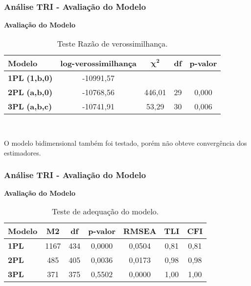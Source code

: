 \documentclass{beamer}
\begin{document}
	\begin{frame}
		
		\frametitle{Análise TRI - Avaliação do Modelo}
		
		\begin{center}
			\textbf{Avaliação do Modelo}
		\end{center}
		
		\begin{table}
			\centering
			\caption{Teste Razão de verossimilhança.}
			\begin{tabular}{lcccc}
				\hline
				\textbf{Modelo} &  \textbf{ log-verossimilhança }& $\boldsymbol{\chi^2}$ & \textbf{df} & \textbf{p-valor }\\ 
				\hline
				\textbf{1PL} \textbf{(1,b,0)} &  -10991,57 &  &  &  \\ 
				\hline
				\textbf{2PL} \textbf{(a,b,0)} & -10768,56 & 446,01 & 29 & 0,000 \\ 
				\hline
				\textbf{3PL} \textbf{(a,b,c)} & -10741,91 & 53,29 & 30 & 0,006 \\ 
				\hline
			\end{tabular}\\
		\end{table}
		
	O modelo bidimensional também foi testado, porém não obteve convergência dos estimadores.
		
	\end{frame}
	

\begin{frame}
	
	\frametitle{Análise TRI - Avaliação do Modelo}
	
	\begin{center}
		\textbf{Avaliação do Modelo}
	\end{center}
	
	
	\begin{table}
		\centering
		\caption{Teste de adequação do modelo.}
		\begin{tabular}{lcccccc}
			\hline
			\textbf{Modelo} & \textbf{M2}& \textbf{df} & \textbf{p-valor} & \textbf{RMSEA} & \textbf{TLI} & \textbf{CFI} \\ 
			\hline 
			\textbf{1PL} & 1167 & 434 & 0,0000 & 0,0504 & 0,81 & 0,81 \\ 
		\hline	\textbf{2PL} & 485 & 405 & 0,0036 & 0,0173 & 0,98 & 0,98 \\ 
		\hline	\textbf{3PL} & 371 & 375 & 0,5502 & 0,0000 & 1,00 & 1,00 \\ 
			\hline
		\end{tabular}
	\end{table}
\end{frame}
\end{document}
